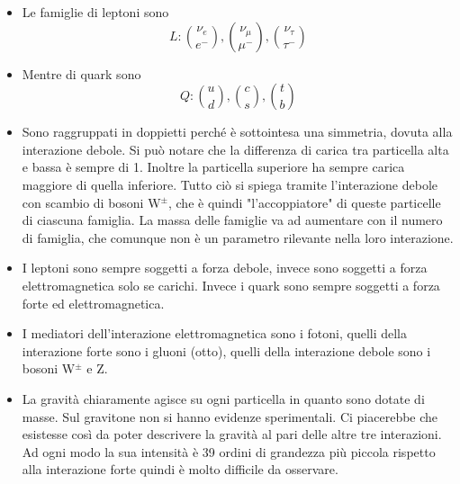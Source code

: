 \begin{itemize}
    \item Le famiglie di leptoni sono 
        \begin{equation*}
            L: \binom{\nu_e}{e^-}, \binom{\nu_\mu}{\mu^-}, \binom{\nu_\tau}{\tau^-}
        \end{equation*}
    \item Mentre di quark sono
        \begin{equation*}
            Q: \binom{u}{d}, \binom{c}{s}, \binom{t}{b}
        \end{equation*}
    \item Sono raggruppati in doppietti perché è sottointesa una simmetria, dovuta alla interazione debole. Si può notare che la differenza di carica tra particella alta e bassa è sempre di 1. Inoltre la particella superiore ha sempre carica maggiore di quella inferiore. Tutto ciò si spiega tramite l'interazione debole con scambio di bosoni W$^\pm$, che è quindi "l'accoppiatore" di queste particelle di ciascuna famiglia. La massa delle famiglie va ad aumentare con il numero di famiglia, che comunque non è un parametro rilevante nella loro interazione.
    \item I leptoni sono sempre soggetti a forza debole, invece sono soggetti a forza elettromagnetica solo se carichi. Invece i quark sono sempre soggetti a forza forte ed elettromagnetica.
    \item I mediatori dell'interazione elettromagnetica sono i fotoni, quelli della interazione forte sono i gluoni (otto), quelli della interazione debole sono i bosoni W$^\pm$ e Z.
    \item La gravità chiaramente agisce su ogni particella in quanto sono dotate di masse. Sul gravitone non si hanno evidenze sperimentali. Ci piacerebbe che esistesse così da poter descrivere la gravità al pari delle altre tre interazioni. Ad ogni modo la sua intensità è 39 ordini di grandezza più piccola rispetto alla interazione forte quindi è molto difficile da osservare.
\end{itemize}
